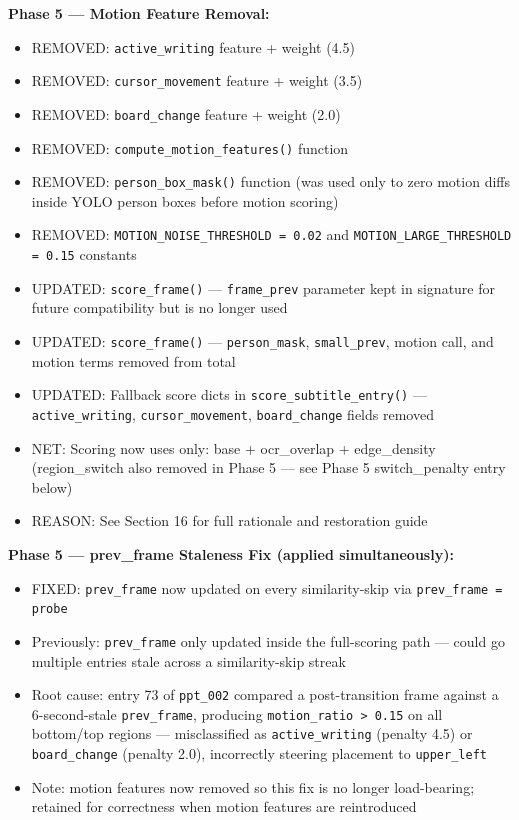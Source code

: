 \documentclass[11pt]{article}
\begin{document}
\textbf{Phase 5 --- Motion Feature Removal:}
\begin{itemize}[leftmargin=1.2em]
    \item REMOVED: \texttt{active\_writing} feature + weight (4.5)
    \item REMOVED: \texttt{cursor\_movement} feature + weight (3.5)
    \item REMOVED: \texttt{board\_change} feature + weight (2.0)
    \item REMOVED: \texttt{compute\_motion\_features()} function
    \item REMOVED: \texttt{person\_box\_mask()} function (was used only to zero motion diffs inside YOLO person boxes before motion scoring)
    \item REMOVED: \texttt{MOTION\_NOISE\_THRESHOLD = 0.02} and \texttt{MOTION\_LARGE\_THRESHOLD = 0.15} constants
    \item UPDATED: \texttt{score\_frame()} --- \texttt{frame\_prev} parameter kept in signature for future compatibility but is no longer used
    \item UPDATED: \texttt{score\_frame()} --- \texttt{person\_mask}, \texttt{small\_prev}, motion call, and motion terms removed from total
    \item UPDATED: Fallback score dicts in \texttt{score\_subtitle\_entry()} --- \texttt{active\_writing}, \texttt{cursor\_movement}, \texttt{board\_change} fields removed
    \item NET: Scoring now uses only: base + ocr\_overlap + edge\_density (region\_switch also removed in Phase 5 — see Phase 5 switch\_penalty entry below)
    \item REASON: See Section 16 for full rationale and restoration guide
\end{itemize}

\textbf{Phase 5 --- prev\_frame Staleness Fix (applied simultaneously):}
\begin{itemize}[leftmargin=1.2em]
    \item FIXED: \texttt{prev\_frame} now updated on every similarity-skip via \texttt{prev\_frame = probe}
    \item Previously: \texttt{prev\_frame} only updated inside the full-scoring path --- could go multiple entries stale across a similarity-skip streak
    \item Root cause: entry 73 of \texttt{ppt\_002} compared a post-transition frame against a 6-second-stale \texttt{prev\_frame}, producing \texttt{motion\_ratio > 0.15} on all bottom/top regions --- misclassified as \texttt{active\_writing} (penalty 4.5) or \texttt{board\_change} (penalty 2.0), incorrectly steering placement to \texttt{upper\_left}
    \item Note: motion features now removed so this fix is no longer load-bearing; retained for correctness when motion features are reintroduced
\end{itemize}
\end{document}
